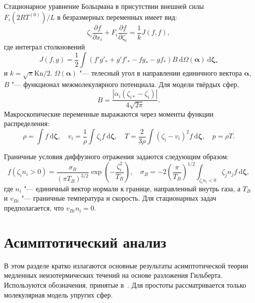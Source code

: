 \documentclass[
aps,%
12pt,%
final,%
notitlepage,%
oneside,%
onecolumn,%
nobibnotes,%
nofootinbib,%
superscriptaddress,%
noshowpacs,%
showkeys,%
centertags]%
{revtex4}
\newcommand{\Kn}{\mathrm{Kn}}
\newcommand{\dd}{\:\mathrm{d}}
\newcommand{\pder}[2][]{\frac{\partial#1}{\partial#2}}
\newcommand{\dzeta}{\boldsymbol{\dd\zeta}}
\begin{document}
Стационарное уравнение Больцмана в присутствии внешней силы \(F_i (2RT^{(0)})/L\) в безразмерных переменных имеет вид:
\begin{equation}\label{eq:Boltzmann}
    \zeta_i\pder[f]{x_i} + F_i\pder[f]{\zeta_i} = \frac1k J(f,f),
\end{equation}
где интеграл столкновений
\begin{equation}\label{eq:integral}
    J(f,g) = \frac12 \int(f'g'_*+g'f'_*-fg_*-gf_*)B\dd\Omega(\boldsymbol\alpha) \dzeta_*
\end{equation}
и \(k = \sqrt\pi\Kn/2\).
\(\Omega(\boldsymbol{\alpha})\) "--- телесный угол в направлении единичного вектора \(\boldsymbol\alpha\),
\(B\) "--- функционал межмолекулярного потенциала. Для модели твёрдых сфер,
\begin{equation}\label{eq:ci_kernel}
    B = \frac{|\alpha_i(\zeta_{i*}-\zeta_i)|}{4\sqrt{2\pi}}.
\end{equation}
Макроскопические переменные выражаются через моменты функции распределения:
\begin{equation}\label{eq:macro}
    \rho = \int f \dzeta, \quad
    v_i = \frac1{\rho} \int \zeta_i f \dzeta, \quad
    T = \frac{2}{3\rho}\int(\zeta_i-v_i)^2 f \dzeta, \quad
    p = \rho T.
\end{equation}

Граничные условия диффузного отражения задаются следующим образом:
\begin{equation}\label{eq:diffuse_bc}
    f\left(\zeta_i n_i > 0\right) =
        \frac{\sigma_B}{(\pi T_B)^{3/2}} \exp\left(-\frac{\zeta_i^2}{T_B}\right), \quad
    \sigma_B = -2\left(\frac{\pi}{T_B}\right)^{1/2} \int_{\zeta_i n_i < 0} \zeta_j n_j f\dzeta,
\end{equation}
где \(n_i\) "--- единичный вектор нормали к границе, направленный внутрь газа,
а \(T_B\) и \(v_{Bi}\) "--- граничные температура и скорость.
Для стационарных задач предполагается, что \(v_{Bi}n_i = 0\).

\section{Асимптотический анализ}

В этом разделе кратко излагаются основные результаты асимптотической теории
медленных неизотермических течений на основе разложения Гильберта.
Используются обозначения, принятые в~\cite{Sone1996, Sone2002, Sone2007}.
Для простоты рассматривается только молекулярная модель упругих сфер.
\end{document}
